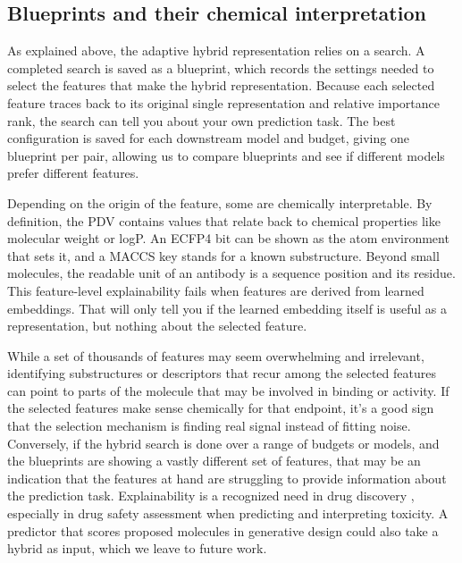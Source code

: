 \subsection{Blueprints and their chemical interpretation}

As explained above, the adaptive hybrid representation relies on a search. A completed search is saved as a blueprint, which records the settings needed to select the features that make the hybrid representation. Because each selected feature traces back to its original single representation and relative importance rank, the search can tell you about your own prediction task. The best configuration is saved for each downstream model and budget, giving one blueprint per pair, allowing us to compare blueprints and see if different models prefer different features. 

Depending on the origin of the feature, some are chemically interpretable. By definition, the PDV contains values that relate back to chemical properties like molecular weight or logP. An ECFP4 bit can be shown as the atom environment that sets it, and a MACCS key stands for a known substructure. Beyond small molecules, the readable unit of an antibody is a sequence position and its residue. This feature-level explainability fails when features are derived from learned embeddings. That will only tell you if the learned embedding itself is useful as a representation, but nothing about the selected feature. 

While a set of thousands of features may seem overwhelming and irrelevant, identifying substructures or descriptors that recur among the selected features can point to parts of the molecule that may be involved in binding or activity. If the selected features make sense chemically for that endpoint, it's a good sign that the selection mechanism is finding real signal instead of fitting noise. Conversely, if the hybrid search is done over a range of budgets or models, and the blueprints are showing a vastly different set of features, that may be an indication that the features at hand are struggling to provide information about the prediction task. Explainability is a recognized need in drug discovery \citep{JimenezLuna2020}, especially in drug safety assessment when predicting and interpreting toxicity. A predictor that scores proposed molecules in generative design \citep{Olivecrona2017} could also take a hybrid as input, which we leave to future work.

